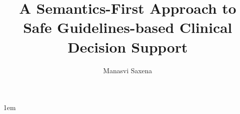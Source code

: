 \documentclass[edeposit,tocnosub,noragright,centerchapter,fullpagesingle,12pt]{uiuc_csthesis21}
\title{A Semantics-First Approach to Safe Guidelines-based Clinical Decision Support}
\author{Manasvi Saxena}
\theoremstyle{definition}
\numberwithin{algocf}{chapter}     %
\begin{document}
\maketitle
\parindent 1em%

\frontmatter



%
\end{document}
